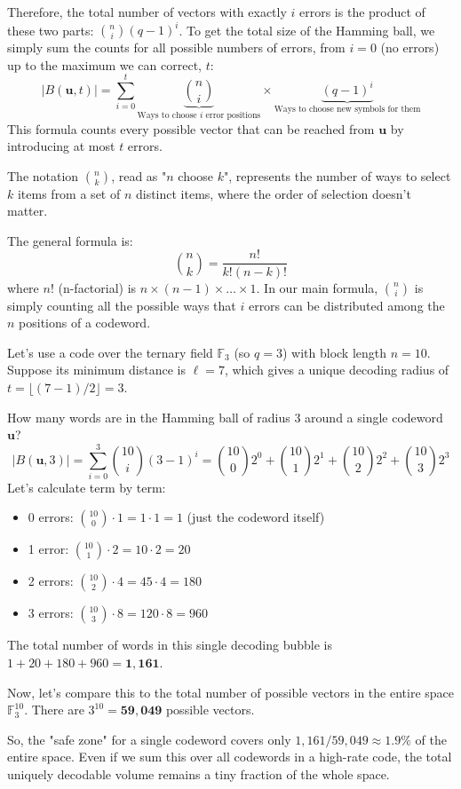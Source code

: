\documentclass{article}
\begin{document}
Therefore, the total number of vectors with exactly $i$ errors is the product of these two parts: $\binom{n}{i} (q-1)^i$. To get the total size of the Hamming ball, we simply sum the counts for all possible numbers of errors, from $i=0$ (no errors) up to the maximum we can correct, $t$:
\[
|B(\mathbf{u}, t)| = \sum_{i=0}^{t} \underbrace{\binom{n}{i}}_{\text{Ways to choose } i \text{ error positions}} \times \underbrace{(q-1)^i}_{\text{Ways to choose new symbols for them}}
\]
This formula counts every possible vector that can be reached from $\mathbf{u}$ by introducing at most $t$ errors.

\begin{tcolorbox}[breakable, title={A Quick Refresher on the Binomial Coefficient $\binom{n}{k}$}]
The notation $\binom{n}{k}$, read as "$n$ choose $k$", represents the number of ways to select $k$ items from a set of $n$ distinct items, where the order of selection doesn't matter.


The general formula is:
\[ \binom{n}{k} = \frac{n!}{k!(n-k)!} \]
where $n!$ (n-factorial) is $n \times (n-1) \times \dots \times 1$. 
In our main formula, $\binom{n}{i}$ is simply counting all the possible ways that $i$ errors can be distributed among the $n$ positions of a codeword.
\end{tcolorbox}





\begin{tcolorbox}[title={Example: Counting Words in a Hamming Ball}]
Let's use a code over the ternary field $\mathbb{F}_3$ (so $q=3$) with block length $n=10$. Suppose its minimum distance is $\ell=7$, which gives a unique decoding radius of $t = \lfloor(7-1)/2\rfloor = 3$.

How many words are in the Hamming ball of radius 3 around a single codeword $\mathbf{u}$?
\[ |B(\mathbf{u}, 3)| = \sum_{i=0}^{3} \binom{10}{i}(3-1)^i = \binom{10}{0}2^0 + \binom{10}{1}2^1 + \binom{10}{2}2^2 + \binom{10}{3}2^3 \]
Let's calculate term by term:
\begin{itemize}
    \item 0 errors: $\binom{10}{0} \cdot 1 = 1 \cdot 1 = 1$ (just the codeword itself)
    \item 1 error:  $\binom{10}{1} \cdot 2 = 10 \cdot 2 = 20$
    \item 2 errors: $\binom{10}{2} \cdot 4 = 45 \cdot 4 = 180$
    \item 3 errors: $\binom{10}{3} \cdot 8 = 120 \cdot 8 = 960$
\end{itemize}
The total number of words in this single decoding bubble is $1 + 20 + 180 + 960 = \mathbf{1,161}$.

Now, let's compare this to the total number of possible vectors in the entire space $\mathbb{F}_3^{10}$. There are $3^{10} = \mathbf{59,049}$ possible vectors.

So, the "safe zone" for a single codeword covers only $1,161 / 59,049 \approx 1.9\%$ of the entire space. Even if we sum this over all codewords in a high-rate code, the total uniquely decodable volume remains a tiny fraction of the whole space.
\end{tcolorbox}
\end{document}
